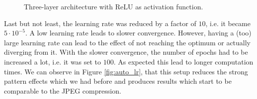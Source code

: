 \documentclass{article}
\begin{document}
\begin{figure}
\begin{subfigure}[b]{0.7 \textwidth}
    \end{subfigure}
    \caption{Three-layer architecture with ReLU as activation function.}
    \label{fig:auto_relu}
\end{figure}


Last but not least, the learning rate was reduced by a factor of $10$, i.e. it became $5 \cdot 10^{-5}$. A low learning rate leads to slower convergence. However, having a (too) large learning rate can lead to the effect of not reaching the optimum or actually diverging from it. With the slower convergence, the number of epochs had to be increased a lot, i.e. it was set to $100$. As expected this lead to longer computation times. We can observe in Figure \ref{fig:auto_lr}, that this setup reduces the strong pattern effects which we had before and produces results which start to be comparable to the JPEG compression.
\end{document}
